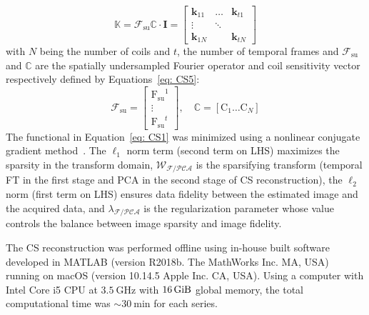 \begin{equation}\label{eq: CS4}
    \mathbb{K} =\mathcal{F}_{\mathrm{su}} \mathbb{C} \cdot \mathbf{I} = \begin{bmatrix} 
    \mathbf{k}_{11} & \dots & \mathbf{k}_{t1} \\
    \vdots & \ddots & \\
    \mathbf{k}_{1N} &        & \mathbf{k}_{tN} 
    \end{bmatrix}
\end{equation}
with $N$ being the number of coils and $t$, the number of temporal frames and $\mathcal{F}_{\mathrm{su}}$ and $\mathbb{C}$ are the spatially undersampled Fourier operator and coil sensitivity vector respectively defined by Equations~\ref{eq: CS5}:
\begin{equation}\label{eq: CS5}
    \mathcal{F}_{\mathrm{su}} = \begin{bmatrix} 
    \mathrm{F_{su}}^{1} \\
    \vdots \\
    \mathrm{F_{su}}^{t}
    \end{bmatrix} , \quad \mathbb{C} = \left[ \mathrm{C}_1 \dots \mathrm{C}_N \right]
\end{equation}
The functional in Equation~\ref{eq: CS1} was minimized using a nonlinear conjugate gradient method~\cite{Lustig:2007cua}. 
The $\ell_1$ norm term (second term on LHS) maximizes the sparsity in the transform domain, $\mathcal{W}_{\mathcal{F}/\mathcal{PCA}}$ is the sparsifying transform (temporal FT in the first stage and PCA in the second stage of CS reconstruction), the $\ell_2$ norm (first term on LHS) ensures data fidelity between the estimated image and the acquired data, and $\lambda_{\mathcal{F}/\mathcal{PCA}}$ is the regularization parameter whose value controls the balance between image sparsity and image fidelity.

The CS reconstruction was performed offline using in-house built software developed in MATLAB (version R2018b. The MathWorks Inc. MA, USA) running on macOS (version 10.14.5 Apple Inc. CA, USA). 
Using a computer with Intel Core i5 CPU at $\SI{3.5}{\giga\hertz}$ with $\SI{16}{\gibi\byte}$ global memory, the total computational time was $\sim \SI{30}{\minute}$ for each series.

